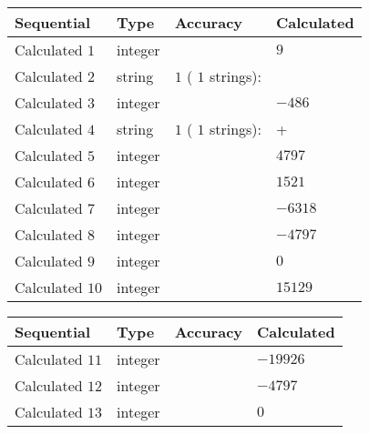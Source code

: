 \documentclass[12pt]{article}
\begin{document}
  
\noindent\begin{tabular}{|l|l|l|l|}
\hline
 Sequential & Type & Accuracy & Calculated \\ 
\hline
 
 
  Calculated $            1 $ & integer &  & 
  $ 9 $ 
 \\  \hline  
 
 
  Calculated $            2 $ & string & $            1  $ ( $           1  $ strings): 
 & 
 \\  \hline  
 
 
  Calculated $            3 $ & integer &  & 
  $ -486 $ 
 \\  \hline  
 
 
  Calculated $            4 $ & string & $            1  $ ( $           1  $ strings): 
 & +
 \\  \hline  
 
 
  Calculated $            5 $ & integer &  & 
  $ 4797 $ 
 \\  \hline  
 
 
  Calculated $            6 $ & integer &  & 
  $ 1521 $ 
 \\  \hline  
 
 
  Calculated $            7 $ & integer &  & 
  $ -6318 $ 
 \\  \hline  
 
 
  Calculated $            8 $ & integer &  & 
  $ -4797 $ 
 \\  \hline  
 
 
  Calculated $            9 $ & integer &  & 
  $ 0 $ 
 \\  \hline  
 
 
  Calculated $           10 $ & integer &  & 
  $ 15129 $ 
 \\  \hline  
 \end{tabular}
   
   
  
  
\noindent\begin{tabular}{|l|l|l|l|}
\hline
 Sequential & Type & Accuracy & Calculated \\ 
\hline
 
 
  Calculated $           11 $ & integer &  & 
  $ -19926 $ 
 \\  \hline  
 
 
  Calculated $           12 $ & integer &  & 
  $ -4797 $ 
 \\  \hline  
 
 
  Calculated $           13 $ & integer &  & 
  $ 0 $ 
 \\  \hline  
 \end{tabular}
   
\end{document}
